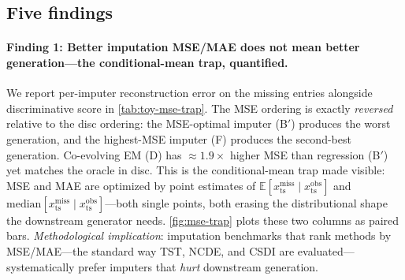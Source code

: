 \documentclass{article}
\theoremstyle{plain}
\theoremstyle{definition}
\theoremstyle{remark}
\newcommand{\xts}{x_{\mathrm{ts}}}
\begin{document}
\subsection{Five findings}
\label{app:toy-findings}

\paragraph{Finding 1: Better imputation MSE/MAE does not mean better generation---the conditional-mean trap, quantified.}
We report per-imputer reconstruction error on the missing entries alongside discriminative score in \cref{tab:toy-mse-trap}. The MSE ordering is exactly \emph{reversed} relative to the disc ordering: the MSE-optimal imputer (B$'$) produces the worst generation, and the highest-MSE imputer (F) produces the second-best generation. Co-evolving EM (D) has $\approx 1.9\times$ higher MSE than regression (B$'$) yet matches the oracle in disc. This is the conditional-mean trap made visible: MSE and MAE are optimized by point estimates of $\mathbb{E}[\xts^{\mathrm{miss}} \mid \xts^{\mathrm{obs}}]$ and $\mathrm{median}[\xts^{\mathrm{miss}} \mid \xts^{\mathrm{obs}}]$---both single points, both erasing the distributional shape the downstream generator needs. \cref{fig:mse-trap} plots these two columns as paired bars. \emph{Methodological implication}: imputation benchmarks that rank methods by MSE/MAE---the standard way TST, NCDE, and CSDI are evaluated---systematically prefer imputers that \emph{hurt} downstream generation.

\begin{table}[h]
\centering
\caption{MSE/MAE inversion on the toy ($p = 0.60$). The MSE-optimal imputer (B$'$) gives the worst generation; the highest-MSE imputer (F) gives the second-best.}
\label{tab:toy-mse-trap}
\end{table}
\end{document}

